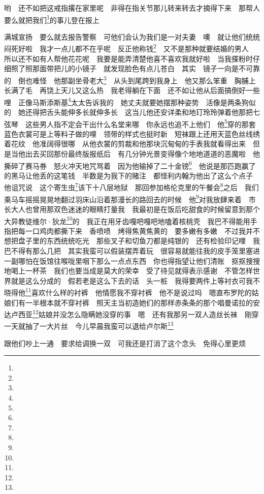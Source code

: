 哟　还不如把这戒指撂在家里呢　非得在指关节那儿转来转去才摘得下来　那帮人要么就把我们\footnote{}的事儿登在报上　
\par 满城宣扬　要么就去报告警察　可他们会认为我们是一对夫妻　噢　就让他们统统闷死好啦　我才一点儿都不在乎呢　反正他称钱\footnote{}　又不是那种就要结婚的男人　所以还不如有人帮他花花呢　我要是能弄清楚他喜不喜欢我就好啦　当我搽粉时仔细照了照那面带把儿的小镜子　就发现脸色有点儿苍白　其实　镜子一向是不可靠的　倒也难怪　他那副坐骨老大\footnote{}　从头到尾跨到我身上　他又那么笨重　胸脯上长满了毛　再饶上天儿又这么热　我老得躺在下面　还不如让他从后面搞倒好一些哩　正像马斯添斯基\footnote{}太太告诉我的　她丈夫就要她摆那种姿势　活像是两条狗似的　她还得把舌头能伸多长就伸多长　这当儿他还安详柔和地玎玲玲弹着他那把七弦琴　这些男人指不定会干出什么名堂来哪　你永远也追不上他们　他\footnote{}穿的那套蓝色衣裳可是上等料子做的哩　领带的样式也挺时新　短袜跟上还用天蓝色丝线绣着花纹　他准阔得很哪　从他衣裳的剪裁和他那块沉甸甸的手表我就看得出来　但是当他出去买回那份最终版报纸后　有几分钟光景变得像个地地道道的恶魔啦　他撕碎了赛马券　怒火冲天地咒骂着　因为他输掉了二十金镑\footnote{}　他说是那匹跑赢了的黑马让他丢的这笔钱　半数是为我下的赌注　都怪利内翰为他出了这么个点子　他诅咒说　这个寄生虫\footnote{}该下十八层地狱　那回参加格伦克里的午餐会\footnote{}之后　我们乘马车摇摇晃晃地翻过羽床山沿着那漫长的路回去的时候　他\footnote{}对我放肆来着　市长大人也曾用那双色迷迷的眼睛打量我　我最初是在饭后吃甜食的时候留意到那个大异教徒维尔·狄龙\footnote{}的　我正在用牙齿嘎吧嘎吧地嗑着核桃壳　我巴不得能用手指把每一口鸡肉都撕下来　香喷喷　烤得焦黄焦黄的　要多嫩有多嫩　不过我并不想把盘子里的东西统统吃光　那些叉子和切鱼刀都是纯银的　还有检验印记哩　我巴不得有那么几把　其实我蛮可以假装摆弄着玩　很容易就能往我的皮手笼里塞进一副哪怕在饭馆往喉咙里咽下那么一点点东西　你也得指望让他们清账　抠抠搜搜地喝上一杯茶　我们也要当成是莫大的荣幸　受了待见就得表示感谢　不管怎样世界就是这么分成的　假若老是这么下去的话　头一桩　我得要两件上等衬衣可我不晓得他\footnote{}喜欢什么样的衬裤　他情愿我不穿衬裤　他不是说过吗　嗯直布罗陀的姑娘们有一半根本就不穿衬裤　照天主当初造她们的那样赤条条的那个唱曼诺拉的安达卢西亚\footnote{}姑娘并没怎么隐瞒她没穿的事　嗯　还有我那另一双人造丝长袜　刚穿一天就抽了一大片丝　今儿早晨我蛮可以退给卢尔斯\footnote{}　
\par 跟他们吵上一通　要求给调换一双　可我还是打消了这个念头　免得心里更烦　
